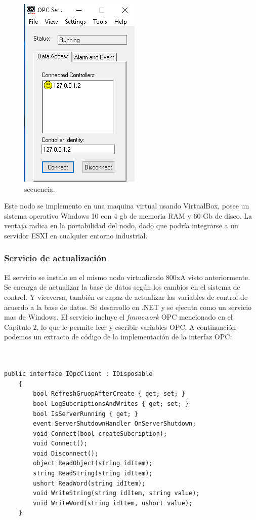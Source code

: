 \begin{figure}[htpb]
	\centering
	\includegraphics[scale=.5]{./Figures/c2.png}
	\caption{secuencia\protect\footnotemark.}
	\label{fig:c2}
\end{figure}

Este nodo se implemento en una maquina virtual usando VirtualBox, posee un sistema operativo Windows 10 con 4 gb de memoria RAM y 60 Gb de disco. La ventaja radica en la portabilidad del nodo, dado que podría integrarse a un servidor ESXI en cualquier entorno industrial. 

\subsubsection{Servicio de actualización}

El servicio se instalo en el mismo nodo virtualizado 800xA visto anteriormente. Se encarga de actualizar la base de datos según los cambios en el sistema de control. Y viceversa, también es capaz de actualizar las variables de control de acuerdo a la base de datos. Se desarrollo en .NET y se ejecuta  como un servicio mas de Windows. El servicio incluye el \textit{framework} OPC mencionado en el Capitulo 2, lo que le permite leer y escribir variables OPC. A continuación podemos un extracto de código de la implementación de la interfaz OPC:
\begin{lstlisting}[label=cod:vControl,caption=Implementacion de la interfaz OPC]  % Start your code-block


public interface IOpcClient : IDisposable
    {
        bool RefreshGruopAfterCreate { get; set; }
        bool LogSubcriptionsAndWrites { get; set; }
        bool IsServerRunning { get; }
        event ServerShutdownHandler OnServerShutdown;
        void Connect(bool createSubcription);
        void Connect();
        void Disconnect();
        object ReadObject(string idItem);
        string ReadString(string idItem);
        ushort ReadWord(string idItem);      
        void WriteString(string idItem, string value);
        void WriteWord(string idItem, ushort value);
    }
\end{lstlisting}


